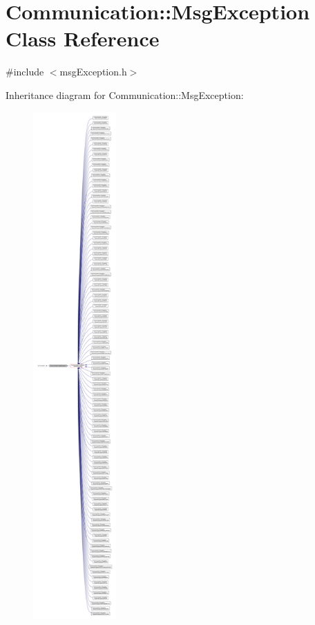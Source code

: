\hypertarget{class_communication_1_1_msg_exception}{}\section{Communication\+:\+:Msg\+Exception Class Reference}
\label{class_communication_1_1_msg_exception}


{\ttfamily \#include $<$msg\+Exception.\+h$>$}



Inheritance diagram for Communication\+:\+:Msg\+Exception\+:\nopagebreak
\begin{figure}[H]
\begin{center}
\leavevmode
\includegraphics[height=550pt]{class_communication_1_1_msg_exception__inherit__graph}
\end{center}
\end{figure}


